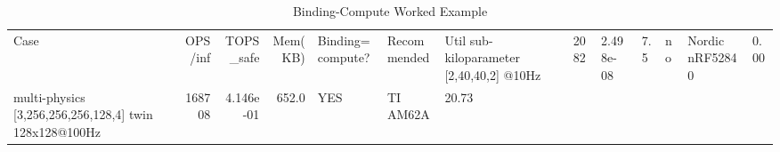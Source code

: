 \begin{table}[htbp]
\centering
\caption{Binding-Compute Worked Example}
\label{tab:binding}
\begin{tabular}{lrrrlll}
\hline
Case & OPS/inf & TOPS_safe & Mem(KB) & Binding=compute? & Recommended & Util %
\hline
sub-kiloparameter [2,40,40,2] @10Hz & 2082 & 2.498e-08 & 7.5 & no & Nordic nRF52840 & 0.00 \\
multi-physics [3,256,256,256,128,4] twin 128x128@100Hz & 168708 & 4.146e-01 & 652.0 & YES & TI AM62A & 20.73 \\
\hline
\end{tabular}
\end{table}
